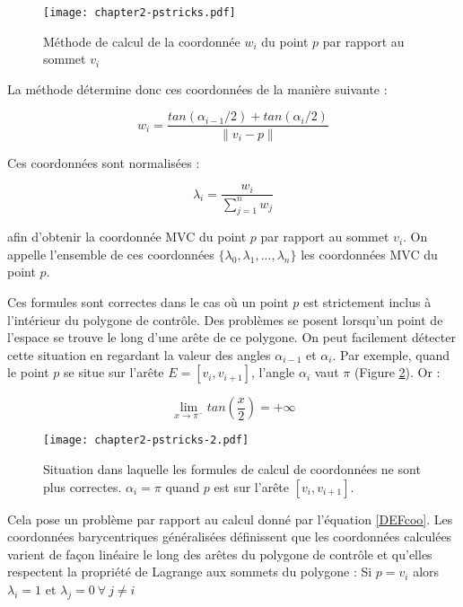 \begin{figure}[ht]
  \begin{center}
    \texttt{[image: chapter2-pstricks.pdf]}
    \caption{Méthode de calcul de la coordonnée $w_i$ du point $p$ par rapport
    au sommet $v_i$}
    \label{DEFcal}
  \end{center}
\end{figure}

La méthode détermine donc ces coordonnées de la manière suivante :

\begin{equation}
  w_i = \frac{tan(\alpha_{i-1}/2) + tan(\alpha_i/2)}{\| v_i - p \|}
  \label{DEFcoo}
\end{equation}

Ces coordonnées sont normalisées :

\begin{equation}
  \lambda_i = \frac{w_i}{\sum_{j=1}^n w_j}
\end{equation}

afin d'obtenir la coordonnée MVC du point $p$ par rapport au sommet $v_i$. On
appelle l'ensemble de ces coordonnées $\{\lambda_0, \lambda_1, ..., \lambda_n\}$
les coordonnées MVC du point $p$.

Ces formules sont correctes dans le cas où un point $p$ est strictement inclus à
l'intérieur du polygone de contrôle. Des problèmes se posent lorsqu'un point de
l'espace se trouve le long d'une arête de ce polygone. On peut facilement
détecter cette situation en regardant la valeur des angles $\alpha_{i-1}$ et
$\alpha_i$. Par exemple, quand le point $p$ se situe sur l'arête $E =
[v_i,v_{i+1}]$, l'angle $\alpha_i$ vaut $\pi$ (Figure \ref{DEFinc}). Or :

\begin{displaymath}
  \lim\limits_{x \to \pi^-} tan(\frac{x}{2}) = +\infty
\end{displaymath}

\begin{figure}[ht]
  \begin{center}
    \texttt{[image: chapter2-pstricks-2.pdf]}
    \caption{Situation dans laquelle les formules de calcul de coordonnées ne
    sont plus correctes. $\alpha_i = \pi$ quand $p$ est sur l'arête
    $[v_i,v_{i+1}]$.}
    \label{DEFinc}
  \end{center}
\end{figure}

Cela pose un problème par rapport au calcul donné par l'équation \ref{DEFcoo}.
Les coordonnées barycentriques généralisées définissent que les coordonnées
calculées varient de façon linéaire le long des arêtes du polygone de contrôle
et qu'elles respectent la propriété de Lagrange aux sommets du polygone : Si $p
= v_i$ alors $\lambda_i = 1$ et $\lambda_j = 0 ~\forall~ j \neq i$ 

